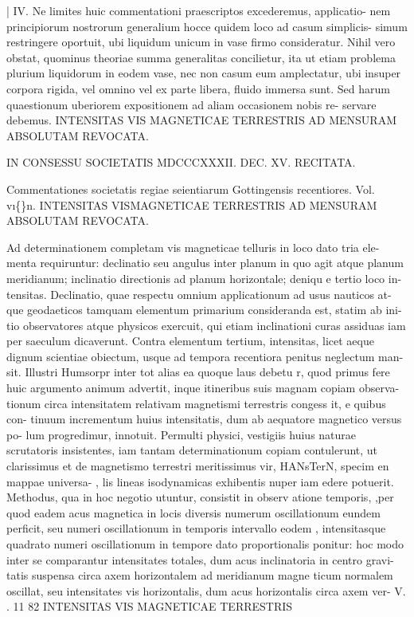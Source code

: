 \documentclass[12pt,a4paper]{article}
\begin{document}
|   IV. Ne limites huic commentationi praescriptos excederemus, applicatio-
nem principiorum nostrorum generalium hocce quidem loco ad casum simplicis-
simum restringere oportuit, ubi liquidum unicum in vase firmo consideratur.
Nihil vero obstat, quominus theoriae summa generalitas concilietur, ita ut etiam
problema plurium liquidorum in eodem vase, nec non casum eum amplectatur,
ubi insuper corpora rigida, vel omnino vel ex parte libera, fluido immersa sunt.
Sed harum quaestionum uberiorem expositionem ad aliam occasionem nobis re-
servare debemus.
INTENSITAS
VIS MAGNETICAE                                   TERRESTRIS
AD MENSURAM                 ABSOLUTAM          REVOCATA.











IN CONSESSU    SOCIETATIS   MDCCCXXXII.    DEC. XV. RECITATA.




Commentationes societatis regiae seientiarum Gottingensis recentiores.   Vol. v\i\{\}n.
INTENSITAS
VISMAGNETICAE TERRESTRIS
AD MENSURAM    ABSOLUTAM     REVOCATA.



Ad determinationem completam vis magneticae telluris in loco dato
tria ele-
menta requiruntur: declinatio seu angulus inter planum in quo agit atque
planum
meridianum; inclinatio directionis ad planum horizontale; deniqu
e tertio loco in-
tensitas. Declinatio, quae respectu omnium applicationum ad
usus nauticos at-
que geodaeticos tamquam elementum primarium consideranda
est, statim ab ini-
tio observatores atque physicos exercuit, qui etiam inclinationi
curas assiduas iam
per saeculum         dicaverunt.   Contra   elementum
tertium, intensitas, licet aeque
dignum scientiae obiectum, usque ad tempora recentiora
penitus neglectum man-
sit. Illustri Humsorpr inter tot alias ea quoque laus debetu
r, quod primus fere
huic argumento animum advertit, inque itineribus suis
magnam copiam observa-
tionum circa intensitatem relativam magnetismi terrestris congess
it, e quibus con-
tinuum incrementum huius intensitatis, dum ab aequatore
magnetico versus po-
lum progredimur, innotuit. Permulti physici, vestigiis huius naturae scrutatoris
insistentes,       iam tantam determinationum    copiam    contulerunt,   ut clarissimus et
de magnetismo terrestri meritissimus vir, HANsTerN, specim
en mappae universa-
, lis lineas isodynamicas exhibentis nuper iam edere potuerit.
Methodus, qua in hoc negotio utuntur, consistit in observ
atione temporis,
,per quod eadem acus magnetica in locis diversis numerum
oscillationum eundem
perficit, seu numeri oscillationum in temporis intervallo eodem
, intensitasque
quadrato numeri oscillationum in tempore dato proportionalis
ponitur: hoc modo
inter se comparantur intensitates totales, dum acus inclinatoria
in centro gravi-
tatis suspensa circa axem horizontalem ad meridianum magne
ticum normalem
oscillat, seu intensitates vis horizontalis,    dum     acus horizontalis circa axem ver-
V.           .
11
82                       INTENSITAS   VIS MAGNETICAE   TERRESTRIS
\end{document}
